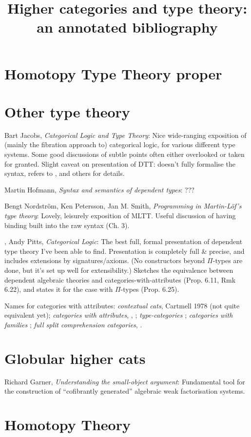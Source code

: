 \documentclass{article}
\begin{document}
\title{Higher categories and type theory: an annotated bibliography}

\section{Homotopy Type Theory proper}

\section{Other type theory}

\cite{jacobs:categorical-logic} Bart Jacobs, \emph{Categorical Logic and Type Theory}: Nice wide-ranging exposition of (mainly the fibration approach to) categorical logic, for various different type systems.  Some good discussions of subtle points often either overlooked or taken for granted.  Slight caveat on presentation of DTT: doesn't fully formalise the syntax, refers to \cite{pitts:categorical-logic}, \cite{hofmann:syntax-and-semantics} and others for details.

\cite{hofmann:syntax-and-semantics} Martin Hofmann, \emph{Syntax and semantics of dependent types}: ???

\cite{n-p-s:programming} Bengt Nordstr\"o{}m, Ken Petersson, Jan M. Smith, \emph{Programming in Martin-L\"o{}f's type theory}: Lovely, leisurely exposition of MLTT.  Useful discussion of having binding built into the raw syntax (Ch. 3).

\cite{pitts:categorical-logic}, Andy Pitts, \emph{Categorical Logic}: The best full, formal presentation of dependent type theory I've been able to find.  Presentation is completely full \& precise, and includes extensions by signatures/axioms.  (No constructors beyond $\Pi$-types are done, but it's set up well for extensibility.)  Sketches the equivalence between dependent algebraic theories and categories-with-attributes (Prop. 6.11, Rmk 6.22), and states it for the case with $\Pi$-types (Prop. 6.25).

Names for categories with attributes: \emph{contextual cats}, Cartmell 1978 (not quite equivalent yet); \emph{categories with attributes}, \cite{hofmann:lcccs}, \cite{hofmann:syntax-and-semantics}; \emph{type-categories} \cite{pitts:categorical-logic}; \emph{categories with families} \cite{dybjer:internal-type-theory}; \emph{full split comprehension categories}, \cite[4.10]{jacobs:comprehension-categories}.

\section{Globular higher cats}

\cite{garner:understanding} Richard Garner, \emph{Understanding the small-object argument}:  Fundamental tool for the construction of ``cofibrantly generated'' algebraic weak factorisation systems.


\section{Homotopy Theory}



\end{document}

